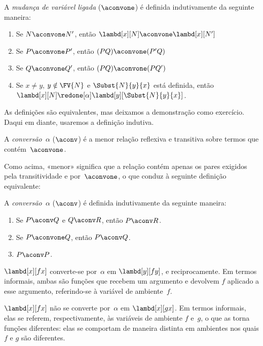 \documentclass[../../../include/open-logic-section]{subfiles}
\begin{document}
\begin{defn} 
  A \emph{mudança de variável ligada} ($\aconvone$) é definida indutivamente
  da seguinte maneira:
  \begin{enumerate}
  \item Se $N \aconvone N'$, então $\lambd[x][N] \aconvone
    \lambd[x][N']$ 
  \item Se $P \aconvone P'$, então $(PQ) \aconvone (P'Q)$ 
  \item Se $Q \aconvone Q'$, então $(PQ) \aconvone (PQ')$ 
  \item Se $x \neq y$, $y \notin \FV{N}$ e $\Subst{N}{y}{x}$ está definida,
    então $\lambd[x][N] \redone[\alpha] \lambd[y][\Subst{N}{y}{x}]$.
  \end{enumerate}
\end{defn}

As definições são equivalentes, mas deixamos a demonstração como exercício.
Daqui em diante, usaremos a definição indutiva.

\begin{defn}
  A \emph{conversão~$\alpha$} ($\aconv$) é a menor relação reflexiva e
  transitiva sobre termos que contém~$\aconvone$.
\end{defn}

Como acima, «menor» significa que a relação contém apenas os pares exigidos
pela transitividade e por~$\aconvone$, o que conduz à seguinte definição
equivalente:

\begin{defn} 
  A \emph{conversão~$\alpha$} ($\aconv$) é definida indutivamente da seguinte
  maneira:
  \begin{enumerate}
  \item Se $P \aconv Q$ e $Q \aconv R$, então $P \aconv R$.
  \item Se $P \aconvone Q$, então $P \aconv Q$. 
  \item $P \aconv P$. 
  \end{enumerate}
\end{defn}

\begin{ex}
  $\lambd[x][f x]$ converte-se por~$\alpha$ em $\lambd[y][f y]$, e
  reciprocamente. Em termos informais, ambas são funções que recebem um
  argumento e devolvem $f$ aplicado a esse argumento, referindo-se à variável
  de ambiente~$f$.

  $\lambd[x][f x]$ não se converte por~$\alpha$ em $\lambd[x][g x]$. Em
  termos informais, elas se referem, respectivamente, às variáveis de ambiente
  $f$ e~$g$, o que as torna funções diferentes: elas se comportam de maneira
  distinta em ambientes nos quais $f$ e $g$ são diferentes.
\end{ex}
\end{document}
